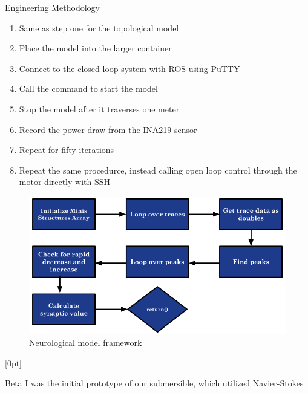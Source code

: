 \documentclass[final, 16pt]{beamer}
\newlength{\colwidth}
\newlength{\twocolwidth}
\begin{document}
\begin{frame}[t]
\begin{columns}[t]
\begin{column}{\twocolwidth}
\begin{block}{Engineering Methodology}
\begin{minipage}[t]{0.48\linewidth}
      \begin{enumerate}
        \item Same as step one for the topological model
        \item Place the model into the larger container
        \item Connect to the closed loop system with ROS using PuTTY
        \item Call the command to start the model
        \item Stop the model after it traverses one meter
        \item Record the power draw from the INA219 sensor
        \item Repeat for fifty iterations
        \item Repeat the same procedurce, instead calling open loop control through the motor directly with SSH
      \end{enumerate}

      \vspace{1cm}

      \begin{figure}[H]
        \centering
         \includegraphics[height=0.5\linewidth, width=0.9\linewidth]{img/Neurological_Model.png}
         \caption{Neurological model framework}
         \label{fig:neurological-model}
       \end{figure}
    \end{minipage}

    \vspace*{1cm}

    [0pt]

    \begin{minipage}[t]{0.48\linewidth}

      Beta I was the initial prototype of our submersible, which utilized Navier-Stokes


\end{minipage}
\end{block}
\end{column}
\end{columns}
\end{frame}
\end{document}
